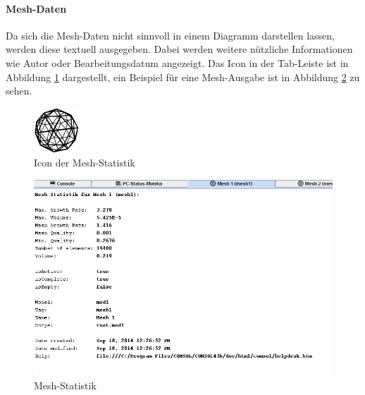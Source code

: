 \documentclass[a4paper,12pt,oneside,openright,onecolumn,final,titlepage,fleqn,ngerman]{scrreprt}
\begin{document}
	\paragraph{Mesh-Daten}
	Da sich die Mesh-Daten nicht sinnvoll in einem Diagramm darstellen lassen, werden diese textuell ausgegeben. Dabei werden weitere nützliche Informationen wie Autor oder Bearbeitungsdatum angezeigt. Das Icon in der Tab-Leiste ist in Abbildung \ref{icon_mesh} dargestellt, ein Beispiel für eine Mesh-Ausgabe ist in Abbildung \ref{ss_mesh} zu sehen.
	\begin{figure}[ht]
		\centering
		\includegraphics[width=64px]{res/mesh.png}
		\caption{Icon der Mesh-Statistik}
		\label{icon_mesh}
	\end{figure}
	\begin{figure}[ht]
		\centering
		\includegraphics[keepaspectratio=true,width=\textwidth]{res/ss_mesh.png}
		\caption{Mesh-Statistik}
		\label{ss_mesh}
	\end{figure}
	
\end{document}
